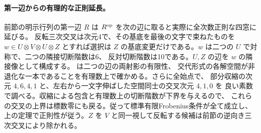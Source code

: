 \paragraph{第一辺からの有理的な正則延長。}
前節の明示行列の第一辺 $R$ は $R^{\rm op}$ を次の辺に取ると実際に全次数正則な四窓に延びる。
反転三次交叉は次元4で、その基底を最後の文字で束ねたものを $w\in U\otimes V\otimes U\otimes Z$
とすれば選択は $Z$ の基底変更だけである。$w$ は二つの $U$ で対称で、二つの隣接切断階数は6、
反対切断階数は10である。$U,Z$ の辺を $w$ の隣接像として構成する。
 は二つの辺の両射影の有限性、
交代形式の各解空間が非退化な一本であることを有理数上で確かめる。さらに全始点で、
部分収縮の次元 $4,6,4,1$ と、左右から一文字伸ばした空間同士の交叉次元 $4,1,0$ を
良い素数で調べる。収縮による包含と有理数上の切断階数が下界を与えるので、
これらの交叉の上界は標数零にも戻る。従って標準有限Frobenius条件が全て成立し、
上の定理で正則性が従う。$Z$ を $V$ と同一視して反転する候補は前節の逆向き三次交叉により除かれる。
